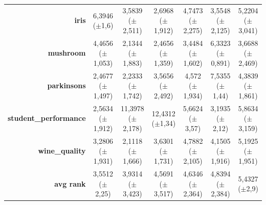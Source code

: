 \documentclass[preprint,review,12pt]{elsarticle}
\begin{document}
\begin{table}[!tb]
{\begin{tabular}{r|ccc|c|c|c|}
			\textbf{iris}                 & \cellcolor[rgb]{ .965,  .91,  .514}6,3946 ($\pm$1,6)                               & \cellcolor[rgb]{ .525,  .784,  .49}3,5839 ($\pm$2,511)  & \cellcolor[rgb]{ .388,  .745,  .482}2,6968 ($\pm$1,912) & \cellcolor[rgb]{ .706,  .835,  .498}4,7473 ($\pm$2,275) & \cellcolor[rgb]{ .522,  .78,  .486}3,5548 ($\pm$2,125)  & \cellcolor[rgb]{ .78,  .859,  .502}5,2204 ($\pm$3,041)  \\
			\textbf{mushroom}             & \cellcolor[rgb]{ .71,  .835,  .498}4,4656 ($\pm$1,053)                             & \cellcolor[rgb]{ .388,  .745,  .482}2,1344 ($\pm$1,883) & \cellcolor[rgb]{ .431,  .757,  .482}2,4656 ($\pm$1,359) & \cellcolor[rgb]{ .569,  .796,  .49}3,4484 ($\pm$1,602)  & \cellcolor[rgb]{ .969,  .91,  .514}6,3323 ($\pm$0,891)  & \cellcolor[rgb]{ .6,  .804,  .494}3,6688 ($\pm$2,469)   \\
			\textbf{parkinsons}           & \cellcolor[rgb]{ .412,  .749,  .482}2,4677 ($\pm$1,497)                            & \cellcolor[rgb]{ .388,  .745,  .482}2,2333 ($\pm$1,742) & \cellcolor[rgb]{ .541,  .788,  .49}3,5656 ($\pm$2,492)  & \cellcolor[rgb]{ .655,  .82,  .494}4,572 ($\pm$1,934)   & \cellcolor[rgb]{ 1,  .922,  .518}7,5355 ($\pm$1,44)     & \cellcolor[rgb]{ .635,  .816,  .494}4,3839 ($\pm$1,861) \\
			\textbf{student\_performance} & \cellcolor[rgb]{ .388,  .745,  .482}2,5634 ($\pm$1,912)                            & \cellcolor[rgb]{ .98,  .506,  .439}11,3978 ($\pm$2,178) & \cellcolor[rgb]{ .973,  .412,  .42}12,4312 ($\pm$1,34)  & \cellcolor[rgb]{ .843,  .875,  .506}5,6624 ($\pm$3,57)  & \cellcolor[rgb]{ .478,  .769,  .486}3,1935 ($\pm$2,12)  & \cellcolor[rgb]{ .875,  .882,  .51}5,8634 ($\pm$3,159)  \\
			\textbf{wine\_quality}        & \cellcolor[rgb]{ .569,  .796,  .49}3,2806 ($\pm$1,931)                             & \cellcolor[rgb]{ .388,  .745,  .482}2,1118 ($\pm$1,666) & \cellcolor[rgb]{ .624,  .812,  .494}3,6301 ($\pm$1,731) & \cellcolor[rgb]{ .808,  .863,  .506}4,7882 ($\pm$2,105) & \cellcolor[rgb]{ .706,  .835,  .498}4,1505 ($\pm$1,916) & \cellcolor[rgb]{ .871,  .882,  .51}5,1925 ($\pm$1,951)  \\
			\midrule
			\textbf{avg rank}             & \cellcolor[rgb]{ .388,  .745,  .482}3,5512 ($\pm$2,25)                             & \cellcolor[rgb]{ .471,  .769,  .486}3,9314 ($\pm$3,423) & \cellcolor[rgb]{ .616,  .808,  .494}4,5691 ($\pm$3,517) & \cellcolor[rgb]{ .631,  .812,  .494}4,6346 ($\pm$2,364) & \cellcolor[rgb]{ .675,  .827,  .498}4,8394 ($\pm$2,384) & \cellcolor[rgb]{ .808,  .867,  .506}5,4327 ($\pm$2,9)   \\

\end{tabular}}
\end{table}
\end{document}
